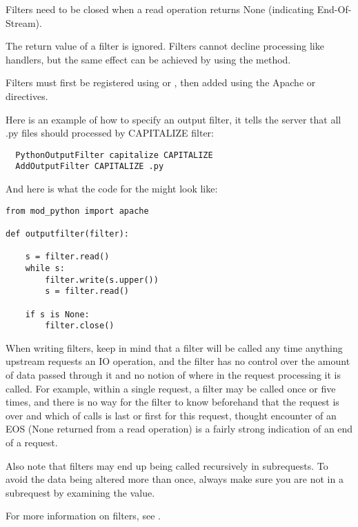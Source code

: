 Filters need to be closed when a read operation returns None 
(indicating End-Of-Stream).

The return value of a filter is ignored. Filters cannot decline
processing like handlers, but the same effect can be achieved
by using the  method.

Filters must first be registered using  or
, then added using the Apache
 or  directives. 

Here is an example of how to specify an output filter, it tells the
server that all .py files should processed by CAPITALIZE filter:

\begin{verbatim}
  PythonOutputFilter capitalize CAPITALIZE
  AddOutputFilter CAPITALIZE .py
\end{verbatim}

And here is what the code for the  might look
like:

\begin{verbatim}
from mod_python import apache
  
def outputfilter(filter):

    s = filter.read()
    while s:
        filter.write(s.upper())
        s = filter.read()

    if s is None:
        filter.close()

\end{verbatim}

When writing filters, keep in mind that a filter will be called any
time anything upstream requests an IO operation, and the filter has no
control over the amount of data passed through it and no notion of
where in the request processing it is called. For example, within a
single request, a filter may be called once or five times, and there
is no way for the filter to know beforehand that the request is over
and which of calls is last or first for this request, thought
encounter of an EOS (None returned from a read operation) is a fairly
strong indication of an end of a request.

Also note that filters may end up being called recursively in
subrequests. To avoid the data being altered more than once, always
make sure you are not in a subrequest by examining the 
value.

For more information on filters, see
.

